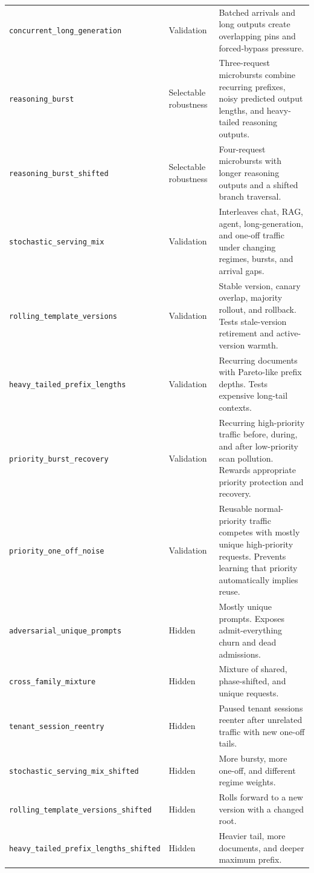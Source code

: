 \documentclass[11pt]{article}
\newcommand{\identifier}[1]{\nolinkurl{#1}}
\begin{document}
\begin{longtable}{>{\raggedright\arraybackslash}p{}
                  >{\raggedright\arraybackslash}p{}
                  >{\raggedright\arraybackslash}p{}}
\identifier{concurrent_long_generation} & Validation &
Batched arrivals and long outputs create overlapping pins and forced-bypass pressure. \\
\identifier{reasoning_burst} & Selectable robustness &
Three-request microbursts combine recurring prefixes, noisy predicted output lengths,
and heavy-tailed reasoning outputs. \\
\identifier{reasoning_burst_shifted} & Selectable robustness &
Four-request microbursts with longer reasoning outputs and a shifted branch traversal. \\
\identifier{stochastic_serving_mix} & Validation &
Interleaves chat, RAG, agent, long-generation, and one-off traffic under changing
regimes, bursts, and arrival gaps. \\
\identifier{rolling_template_versions} & Validation &
Stable version, canary overlap, majority rollout, and rollback.  Tests stale-version
retirement and active-version warmth. \\
\identifier{heavy_tailed_prefix_lengths} & Validation &
Recurring documents with Pareto-like prefix depths.  Tests expensive long-tail
contexts. \\
\identifier{priority_burst_recovery} & Validation &
Recurring high-priority traffic before, during, and after low-priority scan pollution.
Rewards appropriate priority protection and recovery. \\
\identifier{priority_one_off_noise} & Validation &
Reusable normal-priority traffic competes with mostly unique high-priority requests.
Prevents learning that priority automatically implies reuse. \\
\midrule
\identifier{adversarial_unique_prompts} & Hidden &
Mostly unique prompts.  Exposes admit-everything churn and dead admissions. \\
\identifier{cross_family_mixture} & Hidden &
Mixture of shared, phase-shifted, and unique requests. \\
\identifier{tenant_session_reentry} & Hidden &
Paused tenant sessions reenter after unrelated traffic with new one-off tails. \\
\identifier{stochastic_serving_mix_shifted} & Hidden &
More bursty, more one-off, and different regime weights. \\
\identifier{rolling_template_versions_shifted} & Hidden &
Rolls forward to a new version with a changed root. \\
\identifier{heavy_tailed_prefix_lengths_shifted} & Hidden &
Heavier tail, more documents, and deeper maximum prefix. \\

\end{longtable}
\end{document}
